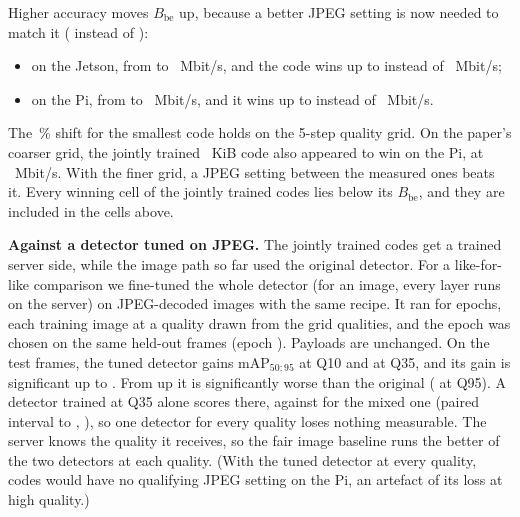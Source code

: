 Higher accuracy moves $B_{\mathrm{be}}$ up, because a better JPEG setting is now needed to match it (\BeJointPiQstar{}
instead of \BePiQstar):
\begin{itemize}
\item on the Jetson, from \BeFrozenFastBe{} to \BeJointFastBe~Mbit/s, and the code wins up to \BeJointFastWin{} instead
of \BeFrozenFastWin~Mbit/s;
\item on the Pi, from \BePiBe{} to \BeJointPiBe~Mbit/s, and it wins up to \BeJointPiWin{} instead of
\BePiWin~Mbit/s.
\end{itemize}
The \BeJointShift\,\% shift for the smallest code holds on the 5-step quality grid. On the paper's coarser grid, the
jointly trained \BeJointKtwoKib~KiB code also appeared to win on the Pi, at \BeJointKtwoPiWinCoarse~Mbit/s. With the
finer grid, a JPEG setting between the measured ones beats it. Every winning cell of the jointly trained codes lies
below its $B_{\mathrm{be}}$, and they are included in the \BeCells{} cells above.

\textbf{Against a detector tuned on JPEG.} The jointly trained codes get a trained server side, while the image path
so far used the original detector. For a like-for-like comparison we fine-tuned the whole detector (for an image,
every layer runs on the server) on JPEG-decoded images with the same recipe. It ran for \BeTunedEpochs{} epochs, each
training image at a quality drawn from the \BeTunedQualities{} grid qualities, and the epoch was chosen on the same
held-out frames (epoch \BeTunedBestEpoch). Payloads are unchanged. On the test frames, the tuned detector gains
\BeTunedGainQten{} mAP$_{50:95}$ at Q10 and \BeTunedGainQthirtyfive{} at Q35, and its gain is significant up to
\BeTunedSigPosMax. From \BeTunedSigNegMin{} up it is significantly worse than the original (\BeTunedGainQninetyfive{}
at Q95). A detector trained at Q35 alone scores \BeTunedDedMap{} there, against \BeTunedMixMapQthirtyfive{} for the
mixed one (paired interval \BeTunedDedLo{} to \BeTunedDedHi, \BeTunedDedSig), so one detector for every quality
loses nothing measurable. The server knows the quality it receives, so the fair image baseline runs the better of
the two detectors at each quality. (With the tuned detector at every quality, \BeTunedMixNoQ{} codes would have no
qualifying JPEG setting on the Pi, an artefact of its loss at high quality.)


